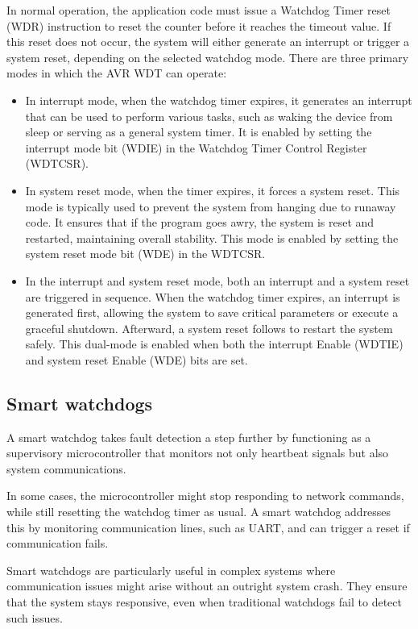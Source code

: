 In normal operation, the application code must issue a Watchdog Timer reset (WDR) instruction to reset the counter before it reaches the timeout value.
 If this reset does not occur, the system will either generate an interrupt or trigger a system reset, depending on the selected watchdog mode.
There are three primary modes in which the AVR WDT can operate:
\begin{itemize}
    \item In interrupt mode, when the watchdog timer expires, it generates an interrupt that can be used to perform various tasks, such as waking the device from sleep or serving as a general system timer. 
        It is enabled by setting the interrupt mode bit (WDIE) in the Watchdog Timer Control Register (WDTCSR).
    \item In system reset mode, when the timer expires, it forces a system reset. 
        This mode is typically used to prevent the system from hanging due to runaway code.
        It ensures that if the program goes awry, the system is reset and restarted, maintaining overall stability. 
        This mode is enabled by setting the system reset mode bit (WDE) in the WDTCSR.
    \item In the interrupt and system reset mode, both an interrupt and a system reset are triggered in sequence. 
        When the watchdog timer expires, an interrupt is generated first, allowing the system to save critical parameters or execute a graceful shutdown. 
        Afterward, a system reset follows to restart the system safely. 
        This dual-mode is enabled when both the interrupt Enable (WDTIE) and system reset Enable (WDE) bits are set.
\end{itemize}

\subsection{Smart watchdogs}
A smart watchdog takes fault detection a step further by functioning as a supervisory microcontroller that monitors not only heartbeat signals but also system communications.

In some cases, the microcontroller might stop responding to network commands, while still resetting the watchdog timer as usual.
A smart watchdog addresses this by monitoring communication lines, such as UART, and can trigger a reset if communication fails. 

Smart watchdogs are particularly useful in complex systems where communication issues might arise without an outright system crash.
 They ensure that the system stays responsive, even when traditional watchdogs fail to detect such issues.

